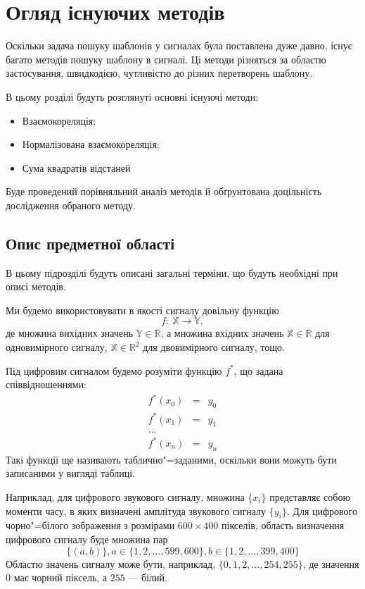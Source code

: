 \chapter{Огляд існуючих методів}

Оскільки задача пошуку шаблонів у сигналах була поставлена дуже давно, існує багато методів пошуку шаблону в сигналі.
Ці методи різняться за областю застосування, швидкодією, чутливістю до різних перетворень шаблону.

В цьому розділі будуть розглянуті основні існуючі методи:
\begin{itemize}
    \item Взаємокореляція;
    \item Нормалізована взаємокореляція;
    \item Сума квадратів відстаней
\end{itemize}

Буде проведений порівняльний аналіз методів й обґрунтована доцільність дослідження обраного методу.

\section{Опис предметної області}
    В цьому підрозділі будуть описані загальні терміни, що будуть необхідні при описі методів.

    Ми будемо використовувати в якості сигналу довільну функцію
    \[f:\:\mathbb{X} \rightarrow \mathbb{Y},\] де множина вихідних значень $\mathbb{Y} \in \mathbb{R}$, а множина
    вхідних значень $\mathbb{X} \in \mathbb{R}$ для одновимірного сигналу, $\mathbb{X} \in \mathbb{R}^2$ для двовимірного сигналу, тощо.

    Під цифровим сигналом будемо розуміти функцію $f^*$, що задана співвідношеннями:
    \begin{eqnarray*}
        f^*(x_0) &=& y_0\\
        f^*(x_1) &=& y_1\\
        \dots\\
        f^*(x_n) &=& y_n
    \end{eqnarray*}
    Такі функції ще називають таблично"=заданими, оскільки вони можуть бути записаними у вигляді таблиці.

    Наприклад, для цифрового звукового сигналу, множина $\{x_i\}$ представляє собою моменти часу, в яких визначені
    амплітуда звукового сигналу $\{y_i\}$.
    Для цифрового чорно"=білого зображення з розмірами $600 \times 400$ пікселів, область визначення цифрового сигналу
    буде множина пар
    \[\{ (a, b) \}, a \in \{1,2,\dots,599,600\}, b \in \{1,2,\dots,399,400\}\]
    Областю значень сигналу може бути, наприклад, $\{0,1,2,\dots,254,255\}$, де значення $0$ має чорний піксель, а
    $255$ --- білий.

